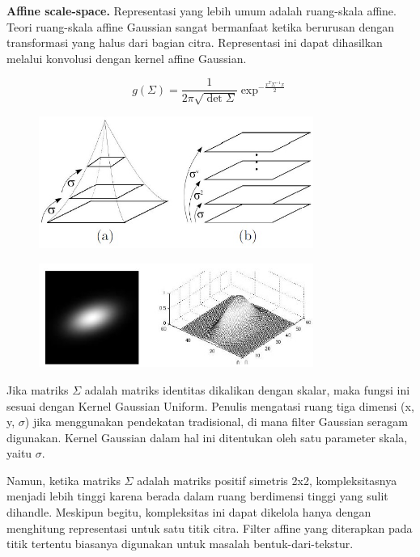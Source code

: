 \textbf{Aﬃne scale-space.} Representasi yang lebih umum adalah ruang-skala affine. 
Teori ruang-skala affine Gaussian sangat bermanfaat ketika berurusan dengan transformasi yang halus dari bagian citra. 
Representasi ini dapat dihasilkan melalui konvolusi dengan kernel affine Gaussian.

\begin{equation}
  g(\Sigma) = \frac{1}{2\pi\sqrt{\det\Sigma}}\exp^{-\frac{x^{T}\Sigma^{-1}x}{2}}
\end{equation}

\begin{figure}
  \centering{}
  \includegraphics[width=0.8\textwidth]{gambar/Scale space.jpg}
  \caption{}
\end{figure}

\begin{figure}
  \centering{}
  \includegraphics[width=0.8\textwidth]{gambar/Affine Gaussian kernel.jpg}
  \caption{}
\end{figure}

Jika matriks \(\Sigma\) adalah matriks identitas dikalikan dengan skalar, 
maka fungsi ini sesuai dengan Kernel Gaussian Uniform. Penulis mengatasi ruang tiga dimensi (x, y, \(\sigma\)) 
jika menggunakan pendekatan tradisional, di mana filter Gaussian seragam digunakan. 
Kernel Gaussian dalam hal ini ditentukan oleh satu parameter skala, yaitu \(\sigma\). 

Namun, ketika matriks \(\Sigma\) adalah matriks positif simetris 2x2, 
kompleksitasnya menjadi lebih tinggi karena berada dalam ruang berdimensi tinggi yang sulit dihandle. 
Meskipun begitu, kompleksitas ini dapat dikelola hanya dengan menghitung representasi untuk satu titik citra. 
Filter affine yang diterapkan pada titik tertentu biasanya digunakan untuk masalah bentuk-dari-tekstur.

